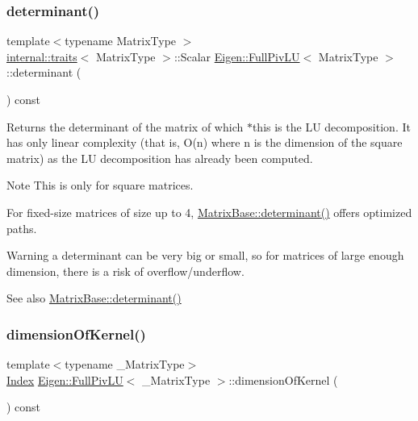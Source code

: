 \subsubsection{\texorpdfstring{determinant()}{determinant()}}
{\footnotesize\ttfamily template$<$typename Matrix\+Type $>$ \\
\mbox{\hyperlink{struct_eigen_1_1internal_1_1traits}{internal\+::traits}}$<$ Matrix\+Type $>$\+::Scalar \mbox{\hyperlink{class_eigen_1_1_full_piv_l_u}{Eigen\+::\+Full\+Piv\+LU}}$<$ Matrix\+Type $>$\+::determinant (\begin{DoxyParamCaption}{ }\end{DoxyParamCaption}) const}

\begin{DoxyReturn}{Returns}
the determinant of the matrix of which $\ast$this is the LU decomposition. It has only linear complexity (that is, O(n) where n is the dimension of the square matrix) as the LU decomposition has already been computed.
\end{DoxyReturn}
\begin{DoxyNote}{Note}
This is only for square matrices.

For fixed-\/size matrices of size up to 4, \mbox{\hyperlink{class_eigen_1_1_matrix_base_a7ad8f77004bb956b603bb43fd2e3c061}{Matrix\+Base\+::determinant()}} offers optimized paths.
\end{DoxyNote}
\begin{DoxyWarning}{Warning}
a determinant can be very big or small, so for matrices of large enough dimension, there is a risk of overflow/underflow.
\end{DoxyWarning}
\begin{DoxySeeAlso}{See also}
\mbox{\hyperlink{class_eigen_1_1_matrix_base_a7ad8f77004bb956b603bb43fd2e3c061}{Matrix\+Base\+::determinant()}} 
\end{DoxySeeAlso}
\mbox{\label{class_eigen_1_1_full_piv_l_u_a64e191225834e91161ea53ad4b78167b}} 
\subsubsection{\texorpdfstring{dimensionOfKernel()}{dimensionOfKernel()}}
{\footnotesize\ttfamily template$<$typename \+\_\+\+Matrix\+Type$>$ \\
\mbox{\hyperlink{struct_eigen_1_1_eigen_base_a554f30542cc2316add4b1ea0a492ff02}{Index}} \mbox{\hyperlink{class_eigen_1_1_full_piv_l_u}{Eigen\+::\+Full\+Piv\+LU}}$<$ \+\_\+\+Matrix\+Type $>$\+::dimension\+Of\+Kernel (\begin{DoxyParamCaption}{ }\end{DoxyParamCaption}) const\hspace{0.3cm}{\ttfamily [inline]}}

